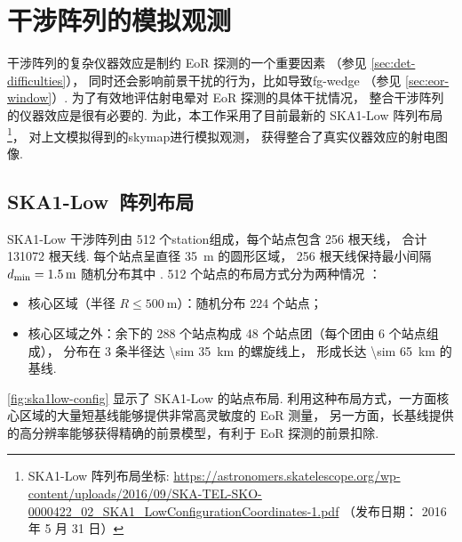 \section{干涉阵列的模拟观测}
\label{sec:obs-simu}

干涉阵列的复杂仪器效应是制约 EoR 探测的一个重要因素
（参见 \autoref{sec:det-difficulties}），
同时还会影响前景干扰的行为，比如导致\ac{fg-wedge}
（参见 \autoref{sec:eor-window}）.
为了有效地评估射电晕对 EoR 探测的具体干扰情况，
整合干涉阵列的仪器效应是很有必要的.
为此，本工作采用了目前最新的 SKA1-Low 阵列布局\footnote{\raggedright%
  SKA1-Low 阵列布局坐标:
  \url{https://astronomers.skatelescope.org/wp-content/uploads/2016/09/SKA-TEL-SKO-0000422_02_SKA1_LowConfigurationCoordinates-1.pdf}
  （发布日期： 2016 年 5 月 31 日）}，
对上文模拟得到的\ac{skymap}进行模拟观测，
获得整合了真实仪器效应的射电图像.

\subsection{SKA1-Low~阵列布局}

SKA1-Low 干涉阵列由 512 个\ac{station}组成，每个站点包含 256 根天线，
合计 \num{131072} 根天线.
每个站点呈直径 \SI{35}{\meter} 的圆形区域，
256 根天线保持最小间隔 $d_{\mathrm{min}} = \SI{1.5}{\meter}$
随机分布其中 \cite{mort2017}.
512 个站点的布局方式分为两种情况 \cite{dewdney2016ska}：
\begin{itemize}
  \item 核心区域（半径 $R \le \SI{500}{\meter}$）：随机分布 224 个站点；
  \item 核心区域之外：余下的 288 个站点构成 48 个站点团（每个团由 6 个站点组成），
    分布在 3 条半径达 \SI{\sim 35}{\km} 的螺旋线上，
    形成长达 \SI{\sim 65}{\km} 的基线.
\end{itemize}
\autoref{fig:ska1low-config} 显示了 SKA1-Low 的站点布局.
利用这种布局方式，一方面核心区域的大量短基线能够提供非常高灵敏度的 EoR 测量，
另一方面，长基线提供的高分辨率能够获得精确的前景模型，有利于 EoR 探测的前景扣除.

